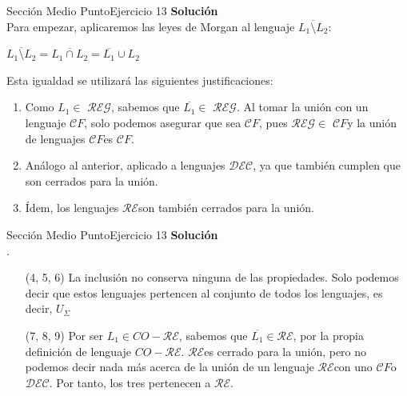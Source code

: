 \documentclass[10pt, envcountsect, presentation, aspectratio=169]{beamer}
\newcommand{\lreg}{\ensuremath{\mathcal {REG}}}
\newcommand{\lcf}{\ensuremath{\mathcal CF}}
\newcommand{\ld}{\ensuremath{\mathcal {DEC}}}
\newcommand{\lr}{\ensuremath{\mathcal {RE}}}
\begin{document}
\begin{frame}{Sección Medio Punto}{Ejercicio 13}
    \textbf{Solución}\\
    Para empezar, aplicaremos las leyes de Morgan al lenguaje $\overline{L_1 \setminus L_2}$:
    
    \begin{center}
        $\overline{L_1 \setminus L_2} = \overline{L_1 \cap L_2}= \overline{L_1}\cup L_2 $
    \end{center}

    Esta igualdad se utilizará las siguientes justificaciones:
    
    \begin{enumerate}[(1)]
        \item Como $L_1 \in$ \lreg, sabemos que $\overline{L_1} \in$ \lreg. Al tomar la unión con un lenguaje \lcf, solo podemos asegurar que sea \lcf, pues \lreg $\in$ \lcf y la unión de lenguajes \lcf \space es \lcf.
        \item Análogo al anterior, aplicado a lenguajes \ld, ya que también cumplen que son cerrados para la unión.
        \item Ídem, los lenguajes \lr \space son también cerrados para la unión.
    \end{enumerate}
\end{frame}

\begin{frame}{Sección Medio Punto}{Ejercicio 13}
    \textbf{Solución}\\
    .
    \begin{enumerate}[label=(\arabic*)]
        \item[(4, 5, 6)] La inclusión no conserva ninguna de las propiedades. Solo podemos decir que estos lenguajes pertencen al conjunto de todos los lenguajes, es decir, $U_\Sigma$
        \item[(7, 8, 9)] Por ser $L_1 \in CO-\lr$, sabemos que $\overline{L_1} \in \lr$, por la propia definición de lenguaje $CO-\lr$. \lr \space es cerrado para la unión, pero no podemos decir nada más acerca de la unión de un lenguaje \lr \space con uno \lcf \space o \ld. Por tanto, los tres pertenecen a \lr.
    \end{enumerate}
\end{frame}
\end{document}
